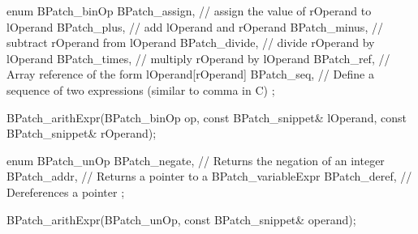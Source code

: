 
\begin{apient}
  enum BPatch_binOp {
    BPatch_assign,  // assign the value of rOperand to lOperand
    BPatch_plus,    // add lOperand and rOperand
    BPatch_minus,   // subtract rOperand from lOperand
    BPatch_divide,  // divide rOperand by lOperand
    BPatch_times,   // multiply rOperand by lOperand
    BPatch_ref,     // Array reference of the form lOperand[rOperand]
    BPatch_seq,     // Define a sequence of two expressions (similar to comma in C)
  };
\end{apient}


\begin{apient}
  BPatch_arithExpr(BPatch_binOp op, const BPatch_snippet& lOperand,
                   const BPatch_snippet& rOperand);
\end{apient}


\begin{apient}
  enum BPatch_unOp {
    BPatch_negate, // Returns the negation of an integer
    BPatch_addr,   // Returns a pointer to a BPatch_variableExpr
    BPatch_deref,  // Dereferences a pointer
  };
\end{apient}


\begin{apient}
  BPatch_arithExpr(BPatch_unOp, const BPatch_snippet& operand);
\end{apient}

